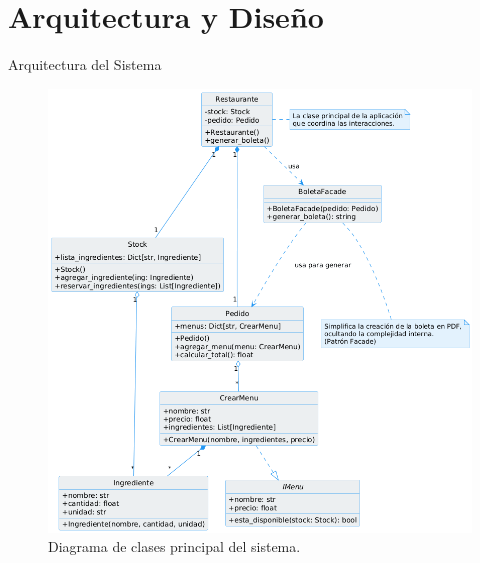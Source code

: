 \documentclass[12pt]{beamer}
\begin{document}
\section{Arquitectura y Diseño}
\begin{frame}{Arquitectura del Sistema}
  \begin{figure}
    \centering
    \includegraphics[width=\linewidth, height=0.8\textheight, keepaspectratio]{images/diagrama.png}
    \caption{Diagrama de clases principal del sistema.}
  \end{figure}
\end{frame}
\end{document}
